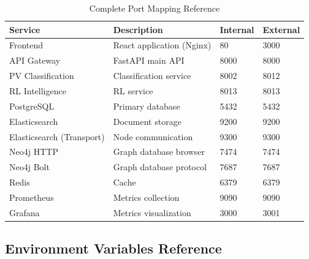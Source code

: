 \begin{table}[h]
\centering
\caption{Complete Port Mapping Reference}
\begin{tabularx}{\textwidth}{lXll}
\toprule
\textbf{Service} & \textbf{Description} & \textbf{Internal} & \textbf{External} \\
\midrule
Frontend & React application (Nginx) & 80 & 3000 \\
API Gateway & FastAPI main API & 8000 & 8000 \\
PV Classification & Classification service & 8002 & 8012 \\
RL Intelligence & RL service & 8013 & 8013 \\
PostgreSQL & Primary database & 5432 & 5432 \\
Elasticsearch & Document storage & 9200 & 9200 \\
Elasticsearch (Transport) & Node communication & 9300 & 9300 \\
Neo4j HTTP & Graph database browser & 7474 & 7474 \\
Neo4j Bolt & Graph database protocol & 7687 & 7687 \\
Redis & Cache & 6379 & 6379 \\
Prometheus & Metrics collection & 9090 & 9090 \\
Grafana & Metrics visualization & 3000 & 3001 \\
\bottomrule
\end{tabularx}
\end{table}

\subsection{Environment Variables Reference}

